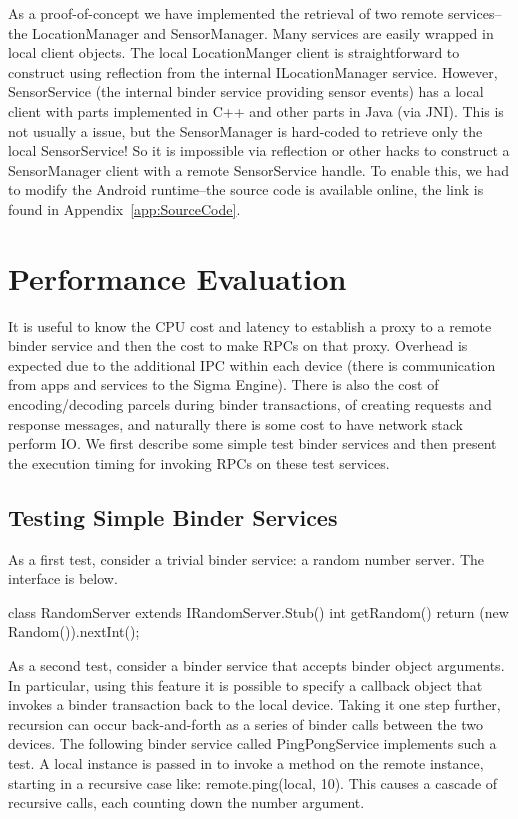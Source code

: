 \documentclass[prodmode]{acmlarge}
\begin{document}
As a proof-of-concept we have implemented the retrieval of two remote services--the LocationManager and SensorManager. Many services are easily wrapped in local client objects. The local LocationManger client is straightforward to construct using reflection from the internal ILocationManager service. However, SensorService (the internal binder service providing sensor events) has a local client with parts implemented in C++ and other parts in Java (via JNI). This is not usually a issue, but the SensorManager is hard-coded to retrieve only the local SensorService! So it is impossible via reflection or other hacks to construct a SensorManager client with a remote SensorService handle. To enable this, we had to modify the Android runtime--the source code is available online, the link is found in Appendix~\ref{app:SourceCode}.

\section{Performance Evaluation}
\label{sec:Performance}
It is useful to know the CPU cost and latency to establish a proxy to a remote binder service and then the cost to make RPCs on that proxy. Overhead is expected due to the additional IPC within each device (there is communication from apps and services to the Sigma Engine). There is also the cost of encoding/decoding parcels during binder transactions, of creating requests and response messages, and naturally there is some cost to have network stack perform IO. We first describe some simple test binder services and then present the execution timing for invoking RPCs on these test services.

\subsection{Testing Simple Binder Services}
As a first test, consider a trivial binder service: a random number server. The interface is below.

\begin{snippet}
class RandomServer extends IRandomServer.Stub() {
  int getRandom() { return (new Random()).nextInt(); }}
\end{snippet}

As a second test, consider a binder service that accepts binder object arguments. In particular, using this feature it is possible to specify a callback object that invokes a binder transaction back to the local device. Taking it one step further, recursion can occur back-and-forth as a series of binder calls between the two devices. The following binder service called PingPongService implements such a test. A local instance is passed in to invoke a method on the remote instance, starting in a recursive case like: remote.ping(local, 10). This causes a cascade of recursive calls, each counting down the number argument.
\end{document}
